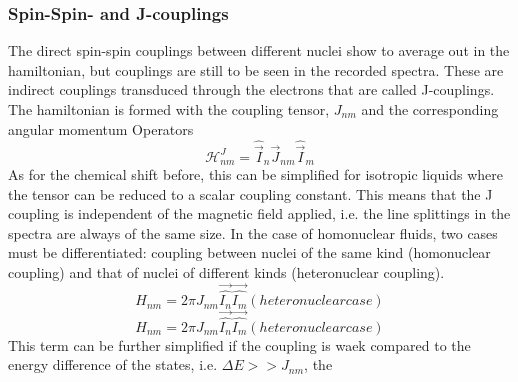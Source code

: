         \subsubsection{Spin-Spin- and J-couplings}
            The direct spin-spin couplings between different nuclei show to average out in the hamiltonian, but couplings are still to be seen in the recorded spectra. These are indirect couplings transduced through the electrons that are called J-couplings. The hamiltonian is formed with the coupling tensor, $J_{nm}$ and the corresponding angular momentum Operators
            \begin{equation}
                \mathcal{H}^J_{nm} = \hat{\vec I}_n \vec J_{nm} \hat{\vec I}_m
            \end{equation}
            As for the chemical shift before, this can be simplified for isotropic liquids where the tensor can be reduced to a scalar coupling constant. This means that the J coupling is independent of the magnetic field applied, i.e. the line splittings in the spectra are always of the same size. In the case of homonuclear fluids, two cases must be differentiated: coupling between nuclei of the same kind (homonuclear coupling) and that of nuclei of different kinds (heteronuclear coupling).
            \begin{equation}
                H_{nm} = 2\pi J_{nm} \vec{\hat{I_n}} \vec{\hat{I_m}} (heteronuclear case)
            \end{equation}
            \begin{equation}
                H_{nm} = 2\pi J_{nm} \vec{\hat{I_n}} \vec{\hat{I_m}} (heteronuclear case)
            \end{equation}
            This term can be further simplified if the coupling is waek compared to the energy difference of the states, i.e. $\Delta E >> J_{nm}$, the 
            
